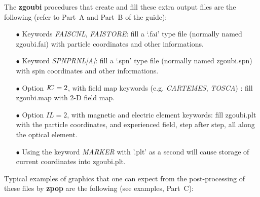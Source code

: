 \noindent The \textbf{zgoubi} procedures that create and fill these extra output 
files are the following (refer to Part~A and Part~B of the 
guide):

\begin{itemize}
  \item[$\bullet$] Keywords \textsl{FAISCNL}, \textsl{FAISTORE}:
   fill a `.fai' type file (normally 
  named zgoubi.fai) with particle 
coordinates and other informations. 

  \item[$\bullet$] Keyword \textsl{SPNPRNL[A]}:
   fill  a `.spn' type file (normally 
  named zgoubi.spn)  with spin 
coordinates and other informations. 

 \item[$\bullet$] Option $I\!C=2$, with field map keywords (e.g. 
 \textsl{CARTEMES}, 
\textsl{TOSCA}) : fill  zgoubi.map  with 2-D field map. 

  \item[$\bullet$] Option $IL=2$, with magnetic and electric element 
keywords: fill zgoubi.plt with the particle coordinates, and 
experienced field, step after step, all along the optical 
element.

  \item[$\bullet$] Using the keyword \textsl{MARKER}  
with '.plt' as a second \LABEL {} will cause storage of current coordinates into zgoubi.plt. 


\end{itemize}

\noindent Typical examples of graphics that one can expect from the 
post-processing of these files by \textbf{zpop}
are the following (see examples, Part~C):

